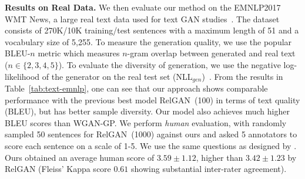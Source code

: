 \documentclass{article}
\newcommand{\0}{\bm{0}}
\begin{document}
\textbf{Results on Real Data.}
We then evaluate our method on the EMNLP2017 WMT News, a large real text data used for text GAN studies~\cite{guo2018long,nie2018relgan}. The dataset consists of 270K/10K training/test sentences with a maximum length of 51 and a vocabulary size of 5,255. To measure the generation quality, we use the popular BLEU-$n$ metric which measures $n$-gram overlap between generated and real text ($n\in\{2,3,4,5\}$). To evaluate the diversity of generation, we use the negative log-likelihood of the generator on the real test set (NLL$_{gen}$)~\cite{guo2018long,nie2018relgan}. From the results in Table~\ref{tab:text-emnlp}, one can see that our approach shows comparable performance with the previous best model RelGAN~(100) in terms of text quality (BLEU), but has better sample diversity.
Our model also achieves much higher BLEU scores than WGAN-GP. 
We perform \emph{human} evaluation, with randomly sampled 50 sentences for RelGAN~(1000) against ours and asked 5 annotators to score each sentence on a scale of 1-5. We use the same questions as designed by \citep{nie2018relgan}. Ours obtained an average human score of $3.59 \pm 1.12$, higher than $3.42 \pm 1.23$ by RelGAN (Fleiss' Kappa score $0.61$ showing substantial inter-rater agreement). 
\end{document}
